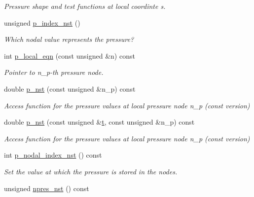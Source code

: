 \begin{DoxyCompactItemize}
\begin{DoxyCompactList}\small\item\em Pressure shape and test functions at local coordinte s. \end{DoxyCompactList}\item 
unsigned \hyperlink{classoomph_1_1GeneralisedNewtonianTTaylorHoodElement_a61571c3c7d44cda27fbb0b177dfb27b9}{p\+\_\+index\+\_\+nst} ()
\begin{DoxyCompactList}\small\item\em Which nodal value represents the pressure? \end{DoxyCompactList}\item 
int \hyperlink{classoomph_1_1GeneralisedNewtonianTTaylorHoodElement_a33beac305cc4372aec3bf180d3ac48da}{p\+\_\+local\+\_\+eqn} (const unsigned \&n) const
\begin{DoxyCompactList}\small\item\em Pointer to n\+\_\+p-\/th pressure node. \end{DoxyCompactList}\item 
double \hyperlink{classoomph_1_1GeneralisedNewtonianTTaylorHoodElement_a014b6af2514d0b354997402d3145dc17}{p\+\_\+nst} (const unsigned \&n\+\_\+p) const
\begin{DoxyCompactList}\small\item\em Access function for the pressure values at local pressure node n\+\_\+p (const version) \end{DoxyCompactList}\item 
double \hyperlink{classoomph_1_1GeneralisedNewtonianTTaylorHoodElement_a9d33cb4f837d7a231ff654acc2cd5f0f}{p\+\_\+nst} (const unsigned \&\hyperlink{cfortran_8h_af6f0bd3dc13317f895c91323c25c2b8f}{t}, const unsigned \&n\+\_\+p) const
\begin{DoxyCompactList}\small\item\em Access function for the pressure values at local pressure node n\+\_\+p (const version) \end{DoxyCompactList}\item 
int \hyperlink{classoomph_1_1GeneralisedNewtonianTTaylorHoodElement_af1aacc302260ae8d987bc48b560304f5}{p\+\_\+nodal\+\_\+index\+\_\+nst} () const
\begin{DoxyCompactList}\small\item\em Set the value at which the pressure is stored in the nodes. \end{DoxyCompactList}\item 
unsigned \hyperlink{classoomph_1_1GeneralisedNewtonianTTaylorHoodElement_a290fdfa0f87a6d4a52823c082c298b4f}{npres\+\_\+nst} () const

\end{DoxyCompactItemize}
